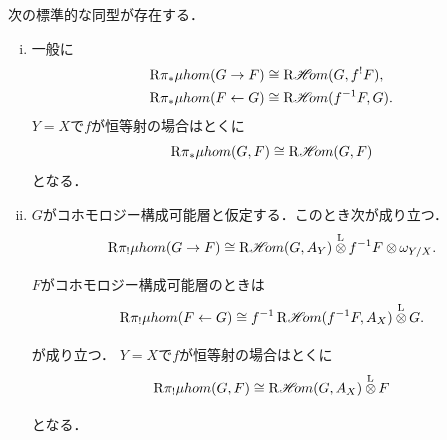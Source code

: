 \begin{leftbar}
\begin{PRP}
  次の標準的な同型が存在する．
  \begin{enumerate}[(i)]
    \item 一般に
    \begin{align*}
      \mathrm{R}{\pi_{\ast}}\mu hom(G\to F)&\cong\mathop{\mathrm{R}\hspace{-1.5pt}\mathop{\mathscr{H}\hspace{-2pt}om}\nolimits}\nolimits(G,f^{!}F),\\
      \mathrm{R}{\pi_{\ast}}\mu hom(F\leftarrow G)&\cong\mathop{\mathrm{R}\hspace{-1.5pt}\mathop{\mathscr{H}\hspace{-2pt}om}\nolimits}\nolimits(f^{-1}F,G).
    \end{align*}
    \(Y=X\)で\(f\)が恒等射の場合はとくに\[
      \mathrm{R}{\pi_{\ast}}\mu hom(G, F)\cong\mathop{\mathrm{R}\hspace{-1.5pt}\mathop{\mathscr{H}\hspace{-2pt}om}\nolimits}\nolimits(G,F)
    \]
    となる．
    \item \(G\)がコホモロジー構成可能層と仮定する．このとき次が成り立つ．\[
      \Rder{\pi_{!}}\muhom(G\to F)
      \cong
      \RHOM(G,A_Y)\lltens[]f^{-1}F\tens[]\omega_{Y/X}.
    \]
    \(F\)がコホモロジー構成可能層のときは
    \[
      \Rder{\pi_{!}}\muhom(F\leftarrow G)
      \cong
      f^{-1}\RHOM(f^{-1}F,A_X)\lltens[]G.
    \]が成り立つ．
    \(Y=X\)で\(f\)が恒等射の場合はとくに\[
      \Rder{\pi_{!}}\muhom(G, F)\cong\RHOM(G,A_X)\lltens[]F
    \]
    となる．
  \end{enumerate}
\end{PRP}
\end{leftbar}
